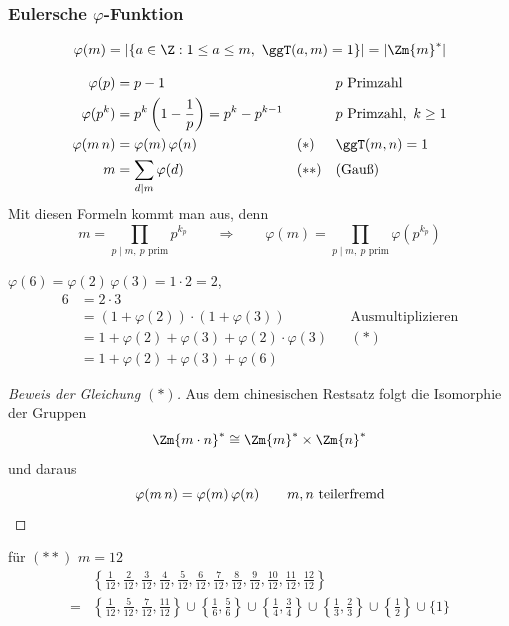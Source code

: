 \subsubsection*{Eulersche $\varphi$-Funktion}


\begin{definition}
\[ \varphi(m) = |\{ a \in \Z : 1 \leq a \leq m,\ \ggT(a, m) = 1 \}| = |\Zm{m}^*| \]
\end{definition}

\begin{satz}
\begin{align*}
\varphi(p) &= p - 1 && && p \text{ Primzahl} \\
\varphi(p^k) &= p^k \left( 1 - \frac{1}{p} \right) = p^k - p^{k-1} && && p \text{ Primzahl},\ k \geq 1 \\
\varphi(m\,n) &= \varphi(m)\, \varphi(n) && (*) && \ggT(m, n) = 1 \\
m &= \sum_{d \mid m} \varphi(d) && (**) && \text{(Gauß)}
\end{align*}
Mit diesen Formeln kommt man aus, denn
\[ m = \prod_{p \mid m,\ p \text{ prim}} p^{k_p} \qquad \Rightarrow \qquad \varphi(m) = \prod_{p \mid m,\ p \text{ prim}} \varphi\left(p^{k_p}\right) \]
\end{satz}

\begin{beispiel}
$\varphi(6) = \varphi(2)\, \varphi(3) = 1 \cdot 2 = 2$,
\begin{align*}
6 &= 2 \cdot 3 \\
&= (1 + \varphi(2)) \cdot (1 + \varphi(3)) && \text{Ausmultiplizieren} \\
&= 1 + \varphi(2) + \varphi(3) + \varphi(2) \cdot \varphi(3) && (*) \\
&= 1 + \varphi(2) + \varphi(3) + \varphi(6)
\end{align*}
\end{beispiel}

\begin{proof}[Beweis der Gleichung $(*)$]
Aus dem chinesischen Restsatz folgt die Isomorphie der Gruppen
\[ \Zm{m \cdot n}^* \cong \Zm{m}^* \times \Zm{n}^* \]
und daraus
\[ \varphi(m\,n) = \varphi(m)\, \varphi(n) \qquad m, n \text{ teilerfremd} \qedhere \]
\end{proof}

\begin{beispiel}
für $(**)$ $m = 12$
\begin{align*}
&\left\{ \frac{1}{12}, \frac{2}{12}, \frac{3}{12}, \frac{4}{12}, \frac{5}{12}, \frac{6}{12}, \frac{7}{12}, \frac{8}{12}, \frac{9}{12}, \frac{10}{12}, \frac{11}{12}, \frac{12}{12} \right\} \\
= &\left\{ \frac{1}{12}, \frac{5}{12}, \frac{7}{12}, \frac{11}{12} \right\} \cup \left\{ \frac{1}{6}, \frac{5}{6} \right\} \cup \left\{ \frac{1}{4}, \frac{3}{4} \right\} \cup \left\{ \frac{1}{3}, \frac{2}{3} \right\} \cup \left\{ \frac{1}{2} \right\} \cup \{1\}
\end{align*}
\end{beispiel}

